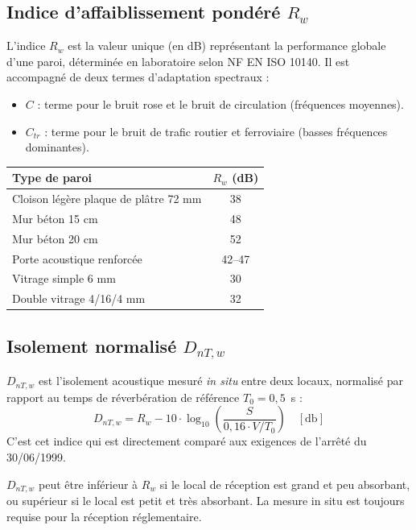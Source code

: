 \subsection{Indice d'affaiblissement pondéré \texorpdfstring{$R_w$}{Rw}}

L'indice $R_w$ est la valeur unique (en dB) représentant la performance globale d'une paroi, déterminée en laboratoire selon NF EN ISO 10140. Il est accompagné de deux termes d'adaptation spectraux :
\begin{itemize}
  \item $C$ : terme pour le bruit rose et le bruit de circulation (fréquences moyennes).
  \item $C_{tr}$ : terme pour le bruit de trafic routier et ferroviaire (basses fréquences dominantes).
\end{itemize}

\begin{center}
\begin{tabular}{lc}
\toprule
Type de paroi & $R_w$ (dB) \\
\midrule
Cloison légère plaque de plâtre 72 mm & 38 \\
Mur béton 15 cm & 48 \\
Mur béton 20 cm & 52 \\
Porte acoustique renforcée & 42--47 \\
Vitrage simple 6 mm & 30 \\
Double vitrage 4/16/4 mm & 32 \\
\bottomrule
\end{tabular}
\end{center}

\subsection{Isolement normalisé \texorpdfstring{$D_{nT,w}$}{DnTw}}

\begin{definition}
$D_{nT,w}$ est l'isolement acoustique mesuré \textit{in situ} entre deux locaux, normalisé par rapport au temps de réverbération de référence $T_0 = 0{,}5$~\si{\second} :
\[
  D_{nT,w} = R_w - 10 \cdot \log_{10}\!\left(\frac{S}{0{,}16 \cdot V / T_0}\right) \quad [\si{\decibel}]
\]
C'est cet indice qui est directement comparé aux exigences de l'arrêté du 30/06/1999.
\end{definition}

\begin{attention}
$D_{nT,w}$ peut être inférieur à $R_w$ si le local de réception est grand et peu absorbant, ou supérieur si le local est petit et très absorbant. La mesure in situ est toujours requise pour la réception réglementaire.
\end{attention}

